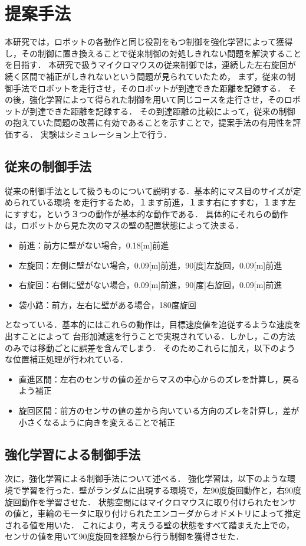 \documentclass[a4paper,11pt]{jsarticle}
\begin{document}
\section{提案手法}
本研究では，ロボットの各動作と同じ役割をもつ制御を強化学習によって獲得し，その制御に置き換えることで従来制御の対処しきれない問題を解決することを目指す．
本研究で扱うマイクロマウスの従来制御では，連続した左右旋回が続く区間で補正がしきれないという問題が見られていたため，
まず，従来の制御手法でロボットを走行させ，そのロボットが到達できた距離を記録する．
その後，強化学習によって得られた制御を用いて同じコースを走行させ，そのロボットが到達できた距離を記録する．
その到達距離の比較によって，従来の制御の抱えていた問題の改善に有効であることを示すことで，提案手法の有用性を評価する．
実験はシミュレーション上で行う．
\subsection{従来の制御手法}
従来の制御手法として扱うものについて説明する．基本的にマス目のサイズが定められている環境
を走行するため，１ます前進，１ます右にすすむ，１ます左にすすむ，という３つの動作が基本的な動作である．
具体的にそれらの動作は，ロボットから見た次のマスの壁の配置状態によって決まる．
\begin{itemize}
  \item 前進：前方に壁がない場合，0.18[m]前進
  \item 左旋回：左側に壁がない場合，0.09[m]前進，90[度]左旋回，0.09[m]前進
  \item 右旋回：右側に壁がない場合，0.09[m]前進，90[度]右旋回，0.09[m]前進
  \item 袋小路：前方，左右に壁がある場合，180度旋回
\end{itemize}
となっている．基本的にはこれらの動作は，目標速度値を追従するような速度を出すことによって
台形加減速を行うことで実現されている．しかし，この方法のみでは移動ごとに誤差を含んでしまう．
そのためこれらに加え，以下のような位置補正処理が行われている．
\begin{itemize}
  \item 直進区間：左右のセンサの値の差からマスの中心からのズレを計算し，戻るよう補正
  \item 旋回区間：前方のセンサの値の差から向いている方向のズレを計算し，差が小さくなるように向きを変えることで補正
\end{itemize}

\subsection{強化学習による制御手法}
次に，強化学習による制御手法について述べる．
強化学習は，以下のような環境で学習を行った．壁がランダムに出現する環境で，左90度旋回動作と，右90度旋回動作を学習させた．
状態空間にはマイクロマウスに取り付けられたセンサの値と，車輪のモータに取り付けられたエンコーダからオドメトリによって推定される値を用いた．
これにより，考えうる壁の状態をすべて踏まえた上での，センサの値を用いて90度旋回を経験から行う制御を獲得させた．
\end{document}
